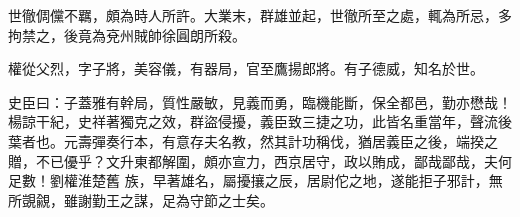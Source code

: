 \begin{pinyinscope}
 世徹倜儻不羈，頗為時人所許。大業末，群雄並起，世徹所至之處，輒為所忌，多拘禁之，後竟為兗州賊帥徐圓朗所殺。



 權從父烈，字子將，美容儀，有器局，官至鷹揚郎將。有子德威，知名於世。



 史臣曰：子蓋雅有幹局，質性嚴敏，見義而勇，臨機能斷，保全都邑，勤亦懋哉！楊諒干紀，史祥著獨克之效，群盜侵擾，義臣致三捷之功，此皆名重當年，聲流後葉者也。元壽彈奏行本，有意存夫名教，然其計功稱伐，猶居義臣之後，端揆之贈，不已優乎？文升東都解圍，頗亦宣力，西京居守，政以賄成，鄙哉鄙哉，夫何足數！劉權淮楚舊
 族，早著雄名，屬擾攘之辰，居尉佗之地，遂能拒子邪計，無所覬覦，雖謝勤王之謀，足為守節之士矣。



\end{pinyinscope}